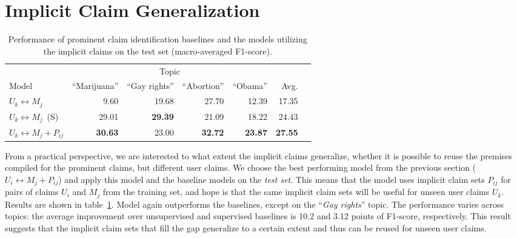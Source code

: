 \section{Implicit Claim Generalization}
\label{sec:argpremise_generalization}

\begin{table}[t]
\begin{center}
{\small
\setlength{\tabcolsep}{5.9pt}
\begin{tabular}{lrrrrrr}
\toprule
&\multicolumn{4}{c}{Topic}\\
\cmidrule(lr){2-5}
Model & ``Marijuana'' & ``Gay rights''  & ``Abortion'' & ``Obama'' & Avg. \\
\midrule
$U_k \leftrightarrow M_j$   & 9.60          & 19.68        & 27.70        & 12.39        & 17.35 \\
$U_k \leftrightarrow M_j$\ (S)   & 29.01         & {\bf 29.39}  & 21.09        & 18.22        & 24.43 \\
$U_k \leftrightarrow M_j + P_{ij}$  & {\bf 30.63}   & 23.00        & {\bf 32.72}  & {\bf 23.87}  & {\bf 27.55} \\
\bottomrule
\end{tabular}}
\caption{Performance of prominent claim identification baselines and the models utilizing the
implicit claims on the test set (macro-averaged F1-score).}
\label{tab:argpremise_generalization}
\end{center}
\end{table}

From a practical perspective, we are interested to what extent the implicit claims
generalize, whether it is possible to reuse the premises compiled for the
prominent claims, but different user claims. 
We choose the best performing model from the previous section ($U_i
\leftrightarrow M_j + P_{ij}$)
and apply this model and the baseline models on the \emph{test set}. 
This means that the model uses implicit claim sets $P_{ij}$ for pairs of claims
$U_i$ and $M_j$ from the training set, and hope is that the same implicit claim
sets will be useful for unseen user claims $U_k$. 
Results are shown in table~\ref{tab:argpremise_generalization}. 
Model again outperforms the baselines, except on the ``\emph{Gay rights}'' topic. 
The performance varies across topics: the average improvement over unsupervised
and supervised baselines is 10.2 and 3.12 points of F1-score, respectively. 
This result suggests that the implicit claim sets that fill the gap generalize to a certain
extent and thus can be reused for unseen user claims. 


